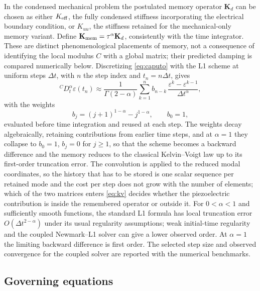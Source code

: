 In the condensed mechanical problem the postulated memory operator
$\mathbf K_d$ can be chosen as either $K_{\rm eff}$, the fully
condensed stiffness incorporating the electrical boundary condition, or
$K_{uu}$, the stiffness retained for the mechanical-only memory variant.
Define $\mathbf K_{\rm mem}=\tau^\alpha\mathbf K_d$, consistently with the time integrator. These are distinct phenomenological placements of memory, not a consequence
of identifying the local modulus $C$ with a global matrix; their predicted
damping is compared numerically below. Discretizing \eqref{eq:caputo} with the L1 scheme at uniform steps
$\Delta t$, with $n$ the step index and $t_n=n\Delta t$, gives
\begin{equation}
  {}^{C}\!D_t^{\alpha}\varepsilon(t_n) \approx
  \frac{1}{\Gamma(2-\alpha)}\sum_{k=1}^{n} b_{n-k}\,
  \frac{\varepsilon^{k}-\varepsilon^{k-1}}{\Delta t^{\alpha}},
  \label{eq:l1}
\end{equation}
with the weights
\begin{equation}
  b_j=(j+1)^{1-\alpha}-j^{1-\alpha},\qquad b_0=1,
  \label{eq:bdef}
\end{equation}
evaluated before time integration and reused at each step. The weights decay algebraically, retaining contributions from earlier
time steps, and at $\alpha=1$ they collapse to $b_0=1$, $b_j=0$ for $j\ge1$, so
that the scheme becomes a backward difference and the memory reduces to the
classical Kelvin--Voigt law up to its first-order truncation error. The
convolution is applied to the reduced modal coordinates, so the history that
has to be stored is one scalar sequence per retained mode and the cost per step
does not grow with the number of elements; which of the two matrices enters
\eqref{eq:kv} decides whether the piezoelectric contribution is inside the
remembered operator or outside it. For $0<\alpha<1$ and sufficiently smooth functions, the standard L1
formula has local truncation error $O(\Delta t^{2-\alpha})$ under its
usual regularity assumptions; weak initial-time regularity and the coupled
Newmark--L1 solver can give a lower observed order. At $\alpha=1$ the
limiting backward difference is first order. The selected step size and
observed convergence for the coupled solver are reported with the numerical
benchmarks.

\FloatBarrier
\subsection{Governing equations}
\label{sec:governing}

